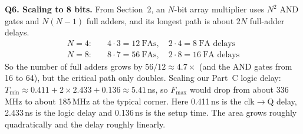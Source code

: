 \documentclass[conference]{IEEEtran}
\begin{document}
\textbf{Q6. Scaling to 8 bits.}
From Section~2, an $N$-bit array multiplier uses $N^2$ AND gates and
$N(N-1)$ full adders, and its longest path is about $2N$ full-adder
delays.
\begin{align*}
N=4:&\quad 4\cdot3 = 12\ \text{FAs},\quad 2\cdot4 = 8\ \text{FA delays}\\
N=8:&\quad 8\cdot7 = 56\ \text{FAs},\quad 2\cdot8 = 16\ \text{FA delays}
\end{align*}
So the number of full adders grows by $56/12 \approx 4.7\times$ (and the
AND gates from 16 to 64), but the critical path only doubles. Scaling
our Part~C logic delay: $T_{\min} \approx 0.411 + 2\times 2.433 + 0.136
\approx 5.41$\,ns, so $F_{\max}$ would drop from about 336\,MHz to about
185\,MHz at the typical corner. Here 0.411\,ns is the clk$\to$Q delay,
2.433\,ns is the logic delay and 0.136\,ns is the setup time. The area
grows roughly quadratically and the delay roughly linearly.
\end{document}
